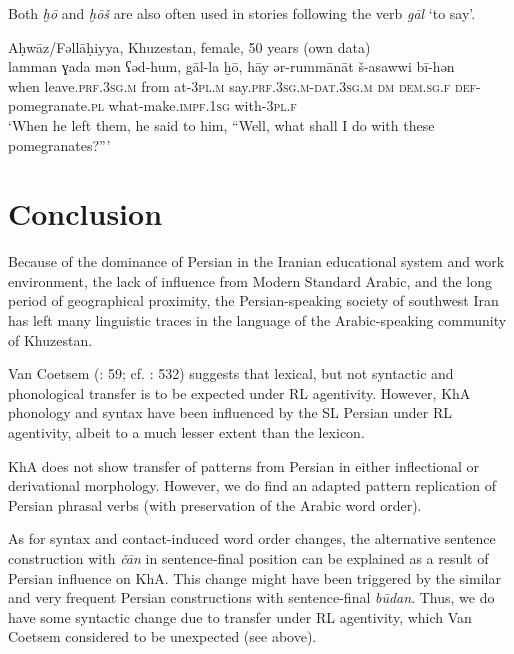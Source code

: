 \documentclass[output=paper,nonflat]{langsci/langscibook}
\begin{document}

Both \textit{ḫō} and \textit{ḫōš} are also often used in stories following the verb \textit{gāl} ‘to say’.

\ea
{Aḥwāz/Fəllāḥiyya, Khuzestan, female, 50 years (own data)}\\
\gll lamman ɣada mən ʕəd-hum, gāl-la ḫō, hāy ər-rummānāt š-asawwi bī-hən\\
     when leave.\textsc{prf}.\textsc{3sg.m} from at-\textsc{3pl.m} say.\textsc{prf}.\textsc{3sg.m}-\textsc{dat.3sg.m} \textsc{dm} \textsc{dem}.\textsc{sg}.\textsc{f} \textsc{def}-pomegranate.\textsc{pl} what-make.\textsc{impf}.\textsc{1sg} with-\textsc{3pl.f}\\
\glt ‘When he left them, he said to him, ``Well, what shall I do with these pomegranates?”’
\z

\section{Conclusion}

Because of the dominance of Persian in the Iranian educational system and work environment, the lack of influence from Modern Standard Arabic, and the long period of geographical proximity, the Persian-speaking society of southwest Iran has left many linguistic traces in the language of the Arabic-speaking community of Khuzestan. 

Van Coetsem (\citeyear{VanCoetsem2000}: 59; cf. \citealt{Lucas2015}: 532) suggests that lexical, but not syntactic and phonological transfer is to be expected under RL agentivity. However, KhA phonology and syntax have been influenced by the SL Persian under RL agentivity, albeit to a much lesser extent than the lexicon.

KhA does not show transfer of patterns from Persian in either inflectional or derivational morphology. However, we do find an adapted pattern replication of Persian phrasal verbs (with preservation of the Arabic word order). 

As for syntax and contact-induced word order changes, the alternative sentence construction with \textit{čān} in sentence-final position can be explained as a result of Persian influence on KhA. This change might have been triggered by the similar and very frequent Persian constructions with sentence-final \textit{būdan}. Thus, we do have some syntactic change due to transfer under RL agentivity, which Van Coetsem considered to be unexpected (see above).
\end{document}

